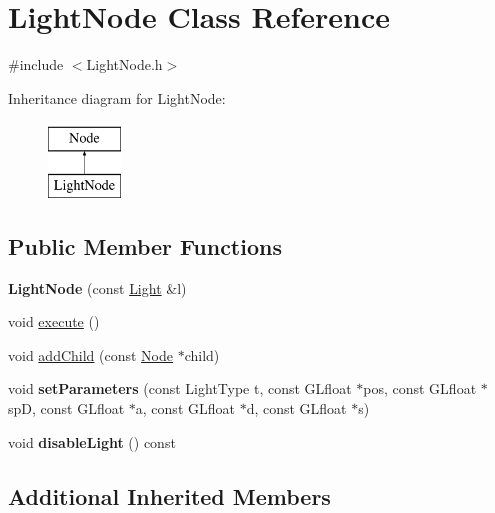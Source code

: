 \hypertarget{classLightNode}{\section{Light\-Node Class Reference}
\label{classLightNode}
}


{\ttfamily \#include $<$Light\-Node.\-h$>$}

Inheritance diagram for Light\-Node\-:\begin{figure}[H]
\begin{center}
\leavevmode
\includegraphics[height=2.000000cm]{classLightNode}
\end{center}
\end{figure}
\subsection*{Public Member Functions}
\begin{DoxyCompactItemize}
\item 
\hypertarget{classLightNode_af1c8654971c8c565770cbda60d0eb69c}{{\bfseries Light\-Node} (const \hyperlink{classLight}{Light} \&l)}\label{classLightNode_af1c8654971c8c565770cbda60d0eb69c}

\item 
void \hyperlink{classLightNode_ab75ed073b22f779c445a46741b40f3c7}{execute} ()
\item 
void \hyperlink{classLightNode_ad8e6562c22da8186eba945c775b80d67}{add\-Child} (const \hyperlink{classNode}{Node} $\ast$child)
\item 
\hypertarget{classLightNode_a9266a158c46c1ccb9ace10211cc9303d}{void {\bfseries set\-Parameters} (const Light\-Type t, const G\-Lfloat $\ast$pos, const G\-Lfloat $\ast$sp\-D, const G\-Lfloat $\ast$a, const G\-Lfloat $\ast$d, const G\-Lfloat $\ast$s)}\label{classLightNode_a9266a158c46c1ccb9ace10211cc9303d}

\item 
\hypertarget{classLightNode_a57ad0c3f24fdaa0543541055c9c753f4}{void {\bfseries disable\-Light} () const }\label{classLightNode_a57ad0c3f24fdaa0543541055c9c753f4}

\end{DoxyCompactItemize}
\subsection*{Additional Inherited Members}


